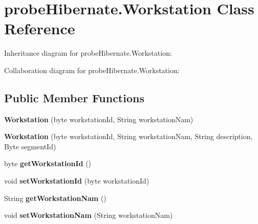 \hypertarget{classprobe_hibernate_1_1_workstation}{}\section{probe\+Hibernate.\+Workstation Class Reference}
\label{classprobe_hibernate_1_1_workstation}


Inheritance diagram for probe\+Hibernate.\+Workstation\+:


Collaboration diagram for probe\+Hibernate.\+Workstation\+:
\subsection*{Public Member Functions}
\begin{DoxyCompactItemize}
\item 
\mbox{\label{classprobe_hibernate_1_1_workstation_a1118734033225ac320f25a11dc9cc3f7}} 
{\bfseries Workstation} (byte workstation\+Id, String workstation\+Nam)
\item 
\mbox{\label{classprobe_hibernate_1_1_workstation_a897eb9fba3dae105565a52ad0ec23488}} 
{\bfseries Workstation} (byte workstation\+Id, String workstation\+Nam, String description, Byte segment\+Id)
\item 
\mbox{\label{classprobe_hibernate_1_1_workstation_a51c569e460c107a359677f2ee0ab1c36}} 
byte {\bfseries get\+Workstation\+Id} ()
\item 
\mbox{\label{classprobe_hibernate_1_1_workstation_a6715bc3771b15a2b05db024d4aa4d8dc}} 
void {\bfseries set\+Workstation\+Id} (byte workstation\+Id)
\item 
\mbox{\label{classprobe_hibernate_1_1_workstation_addf26e495c7ec0c82d2a49004736b164}} 
String {\bfseries get\+Workstation\+Nam} ()
\item 
\mbox{\label{classprobe_hibernate_1_1_workstation_addc0d793afe6796ca358b8e97839a98a}} 
void {\bfseries set\+Workstation\+Nam} (String workstation\+Nam)
\item 

\end{DoxyCompactItemize}
